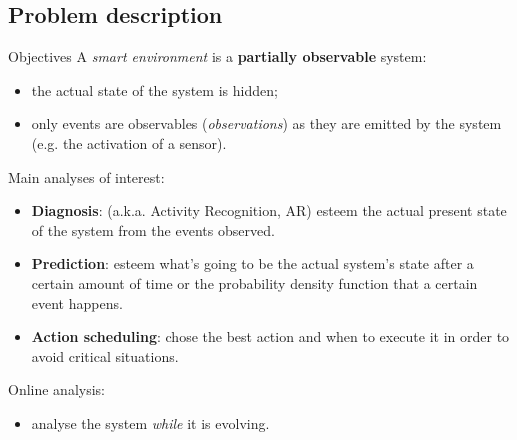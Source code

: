 \documentclass[9pt, handout]{beamer}
\begin{document}
    \subsection{Problem description}
      \begin{frame}{Objectives}
        \pause
        A \textit{smart environment} is a \textbf{partially observable} system:
        \pause
        \begin{itemize}
          \item the actual state of the system is hidden;
          \pause
          \item only events are observables (\textit{observations}) as they are emitted by the system (e.g. the activation of a sensor).
        \end{itemize}
        
        \vspace{1em}
        \pause
        Main analyses of interest:
        \pause
        \begin{itemize}
          \item \textbf{Diagnosis}: (a.k.a. Activity Recognition, AR) esteem the actual present state of the system from the events observed.
          \pause
          \item \textbf{Prediction}: esteem what's going to be the actual system's state after a certain amount of time or the probability density function that a certain event happens.
          \pause
          \item \textbf{Action scheduling}: chose the best action and when to execute it in order to avoid critical situations.
        \end{itemize}
        
        \vspace{1em}
        \pause
        Online analysis:
        \pause
        \begin{itemize}
          \item analyse the system \textit{while} it is evolving.
        \end{itemize}
      \end{frame}
      
\end{document}
